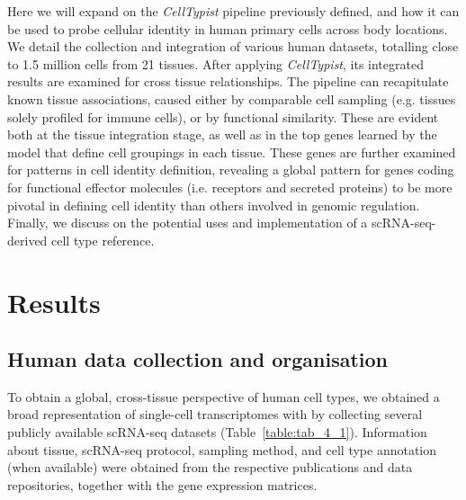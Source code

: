 Here we will expand on the \textit{CellTypist} pipeline previously defined, and how it can be used to probe cellular identity in human primary cells across body locations. We detail the collection and integration of various human datasets, totalling close to 1.5 million cells from 21 tissues. After applying \textit{CellTypist}, its integrated results are examined for cross tissue relationships. The pipeline can recapitulate known tissue associations, caused either by comparable cell sampling (e.g. tissues solely profiled for immune cells), or by functional similarity. These are evident both at the tissue integration stage, as well as in the top genes learned by the model that define cell groupings in each tissue. These genes are further examined for patterns in cell identity definition, revealing a global pattern for genes coding for functional effector molecules (i.e. receptors and secreted proteins) to be more pivotal in defining cell identity than others involved in genomic regulation. Finally, we discuss on the potential uses and implementation of a scRNA-seq-derived cell type reference.


\section{Results}
\label{section4.2}
\subsection{Human data collection and organisation}
\label{section4.2_coll}
To obtain a global, cross-tissue perspective of human cell types, we obtained a broad representation of single-cell transcriptomes with by collecting several publicly available scRNA-seq datasets (Table~\ref{table:tab_4_1}). Information about tissue, scRNA-seq protocol, sampling method, and cell type annotation (when available) were obtained from the respective publications and data repositories, together with the gene expression matrices.

